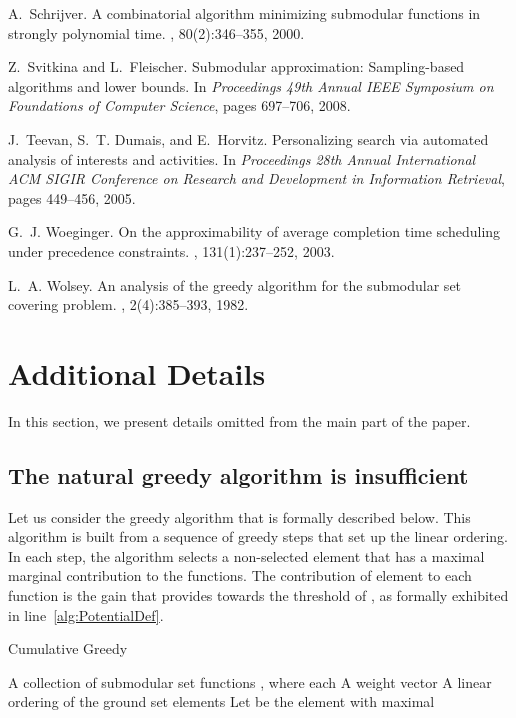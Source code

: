 \documentclass[11pt]{article}
\theoremstyle{plain}
\theoremstyle{definition}
\begin{document}
\begin{thebibliography}{10}
A.~Schrijver.
\newblock A combinatorial algorithm minimizing submodular functions in strongly
  polynomial time.
, 80(2):346--355, 2000.

Z.~Svitkina and L.~Fleischer.
\newblock Submodular approximation: Sampling-based algorithms and lower bounds.
\newblock In {\em Proceedings 49th Annual IEEE Symposium on Foundations of
  Computer Science}, pages 697--706, 2008.

J.~Teevan, S.~T. Dumais, and E.~Horvitz.
\newblock Personalizing search via automated analysis of interests and
  activities.
\newblock In {\em Proceedings 28th Annual International ACM SIGIR Conference on
  Research and Development in Information Retrieval}, pages 449--456, 2005.

G.~J. Woeginger.
\newblock On the approximability of average completion time scheduling under
  precedence constraints.
, 131(1):237--252, 2003.

L.~A. Wolsey.
\newblock An analysis of the greedy algorithm for the submodular set covering
  problem.
, 2(4):385--393, 1982.

\end{thebibliography}


\appendix
\section{Additional Details} \label{appsec:AdditionalDetails}
In this section, we present details omitted from the main part of
the paper.

\subsection{The natural greedy algorithm is insufficient} \label{appsubsec:NonAdaptiveFail}

Let us consider the greedy algorithm that is formally described
below. This algorithm is built from a sequence of greedy steps
that set up the linear ordering. In each step, the algorithm
selects a non-selected element that has a maximal marginal
contribution to the functions. The contribution of element  to
each function  is the gain that  provides towards the
threshold of , as formally exhibited in
line~\ref{alg:PotentialDef}.

\begin{algorithm}
\caption{Cumulative Greedy}\label{cap:CumulativeGreedy}
\begin{algorithmic}[1]
\Require A collection of  submodular set functions , where each  \Statex \qquad\quad A weight vector  \Ensure A linear ordering  of the ground set elements \smallskip 
\State  {}  \ForAll{} \State  \label{alg:PotentialDef} \EndFor \EndFor \State Let  be the element with maximal  \State  \State  \EndFor \end{algorithmic}
\end{algorithm}
\end{document}
